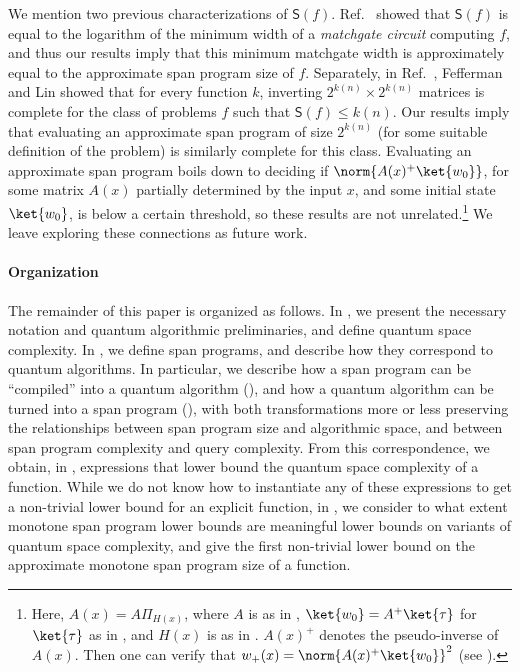 \documentclass[11pt]{article}
\numberwithin{equation}{section}
\theoremstyle{definition}
\theoremstyle{plain}
\begin{document}
We mention two previous characterizations of $\mathsf{S}(f)$. 
Ref.~\cite{JKMW09} showed that $\mathsf{S}(f)$ is equal to the logarithm of the minimum width of a \emph{matchgate circuit} computing $f$, and thus our results imply that this minimum matchgate width is approximately equal to the approximate span program size of $f$. 
Separately, in Ref.~\cite{FL18}, Fefferman and Lin showed that for every function $k$, inverting $2^{k(n)}\times 2^{k(n)}$ matrices is complete for the class of problems $f$ such that $\mathsf{S}(f)\leq k(n)$. Our results imply that evaluating an approximate span program of size $2^{k(n)}$ (for some suitable definition of the problem) is similarly complete for this class. Evaluating an approximate span program boils down to deciding if $\norm{A(x)^+\ket{w_0}}$, for some matrix $A(x)$ partially determined by the input $x$, and some initial state $\ket{w_0}$, is below a certain threshold, so these results are not 
unrelated.\footnote{Here, $A(x)=A\Pi_{H(x)}$, where $A$ is as in , $\ket{w_0}=A^+\ket{\tau}$ for $\ket{\tau}$ as in , and $H(x)$ is as in . $A(x)^+$ denotes the pseudo-inverse of $A(x)$. Then one can verify that $w_+(x)=\norm{A(x)^+\ket{w_0}}^2$ (see ).}
We leave exploring these connections as future work. 








\paragraph{Organization} The remainder of this paper is organized as follows. In , we present the necessary notation and quantum algorithmic preliminaries, and define quantum space complexity. In , we define span programs, and describe how they correspond to quantum algorithms. In particular, we describe how a span program can be ``compiled'' into a quantum algorithm (), and how a quantum algorithm can be turned into a span program (), with both transformations more or less preserving the relationships between span program size and algorithmic space, and between span program complexity and query complexity. From this correspondence, we obtain, in , expressions that lower bound the quantum space complexity of a function. While we do not know how to instantiate any of these expressions to get a non-trivial lower bound for
%
an explicit  %
function, in , we consider to what extent monotone span program lower bounds are meaningful lower bounds on variants of quantum space complexity, and give the first non-trivial lower bound on the approximate monotone span program size of a function.
\end{document}
